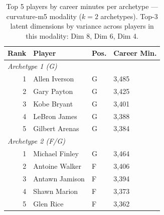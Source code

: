\begin{table}[htbp]
  \centering\small
  \begin{tabular}{rlll}
    \toprule
    Rank & Player & Pos. & Career Min. \\
    \midrule
    \multicolumn{4}{l}{\textit{Archetype 1 (G)}} \\
    \midrule
    1 & Allen Iverson & G & 3,485 \\
    2 & Gary Payton & G & 3,425 \\
    3 & Kobe Bryant & G & 3,401 \\
    4 & LeBron James & G & 3,388 \\
    5 & Gilbert Arenas & G & 3,384 \\
    \midrule[0.4pt]
    \multicolumn{4}{l}{\textit{Archetype 2 (F/G)}} \\
    \midrule
    1 & Michael Finley & G & 3,464 \\
    2 & Antoine Walker & F & 3,406 \\
    3 & Antawn Jamison & F & 3,394 \\
    4 & Shawn Marion & F & 3,373 \\
    5 & Glen Rice & F & 3,362 \\
    \bottomrule
  \end{tabular}
  \caption{Top 5 players by career minutes per archetype --- curvature-m5 modality ($k=2$ archetypes). Top-3 latent dimensions by variance across players in this modality: Dim 8, Dim 6, Dim 4.}
  \label{tab:arch_reps_curvature_m5}
\end{table}

